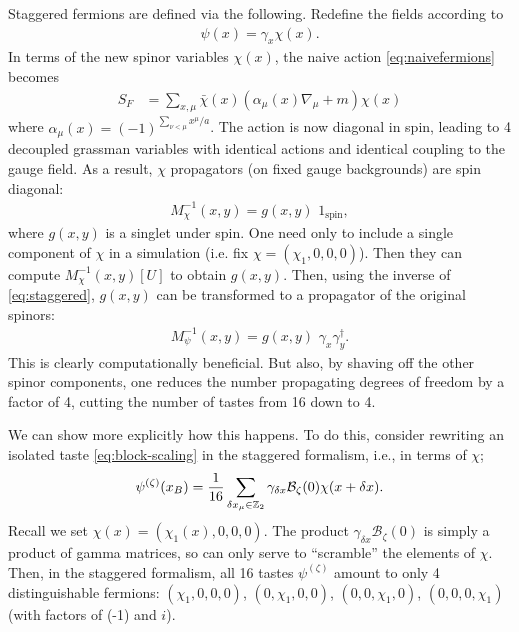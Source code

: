     Staggered fermions are defined via the following. Redefine the fields according to
    \begin{align}
      \psi(x) = \gamma_x \chi(x).
      \label{eq:staggered}
    \end{align}
    In terms of the new spinor variables $\chi(x)$, the naive action \eqref{eq:naivefermions} becomes
    \begin{align}
      S_F &= \sum_{x,\mu} \bar{\chi}(x)(\alpha_{\mu}(x) \nabla_{\mu} + m ) \chi(x)
    \end{align}
    where $\alpha_{\mu}(x) = (-1)^{\sum_{\nu < \mu} x^{\mu}/a}$. The action is now diagonal in spin, leading to 4 decoupled grassman variables with identical actions and identical coupling to the gauge field. As a result, $\chi$ propagators (on fixed gauge backgrounds) are spin diagonal:
    \begin{align}
      M^{-1}_{\chi}(x,y) = g(x,y) \,\, 1_{\text{spin}},
    \end{align}
    where $g(x,y)$ is a singlet under spin. One need only to include a single component of $\chi$ in a simulation (i.e. fix $\chi = (\chi_1,0,0,0)$). Then they can compute $M^{-1}_{\chi}(x,y)[U]$ to obtain $g(x,y)$. Then, using the inverse of \eqref{eq:staggered}, $g(x,y)$ can be transformed to a propagator of the original spinors:
    \begin{align}
      M_{\psi}^{-1}(x,y) = g(x,y) \,\,\gamma_x \gamma^{\dagger}_y.
    \end{align}
    This is clearly computationally beneficial. But also, by shaving off the other spinor components, one reduces the number propagating degrees of freedom by a factor of 4, cutting the number of tastes from 16 down to 4.

    We can show more explicitly how this happens. To do this, consider rewriting an isolated taste \eqref{eq:block-scaling} in the staggered formalism, i.e., in terms of $\chi$;
    \begin{align}
      \psi^{(\zeta)}(x_B) = {1\over 16} \sum_{\delta x_{\mu} \in \mathbb{Z}_2} \gamma_{\delta x} \mathcal{B}_{\zeta}(0) \chi(x+\delta x).
    \label{eq:chi_blockscale}
    \end{align}
    Recall we set $\chi(x) = (\chi_1(x),0,0,0)$. The product $\gamma_{\delta x} \mathcal{B}_{\zeta}(0)$ is simply a product of gamma matrices, so can only serve to ``scramble'' the elements of $\chi$. Then, in the staggered formalism, all 16 tastes $\psi^{(\zeta)}$ amount to only 4 distinguishable fermions: $(\chi_1,0,0,0)$, $(0,\chi_1,0,0)$, $(0,0,\chi_1,0)$, $(0,0,0,\chi_1)$ (with factors of (-1) and $i$).

